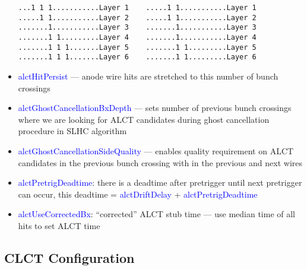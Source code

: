 \begin{itemize}
\begin{verbatim}
...1 1 1...........Layer 1    .....1 1...........Layer 1
.....1 1...........Layer 2    .....1 1...........Layer 2
.......1...........Layer 3    .......1...........Layer 3
.......1 1.........Layer 4    .......1...........Layer 4
.......1 1 1.......Layer 5    .......1 1.........Layer 5
.......1 1 1.......Layer 6    .......1 1.........Layer 6
\end{verbatim}
	\item \textcolor{blue}{alctHitPersist} --- anode wire hits are stretched to this number of bunch crossings
	\item \textcolor{blue}{alctGhostCancellationBxDepth} --- sets number of previous bunch crossings where we are looking for ALCT candidates during ghost cancellation procedure in SLHC algorithm
	\item \textcolor{blue}{alctGhostCancellationSideQuality} --- enables quality requirement on ALCT candidates in the previous bunch crossing with in the previous and next wires
	\item \textcolor{blue}{alctPretrigDeadtime}: there is a deadtime after pretrigger until next pretrigger can occur, this deadtime = \textcolor{blue}{alctDriftDelay} + \textcolor{blue}{alctPretrigDeadtime}
	\item \textcolor{blue}{alctUseCorrectedBx}: ``corrected'' ALCT stub time --- use median time of all hits to set ALCT time
\end{itemize}

\newpage

\subsection{CLCT Configuration}
\label{sec:CLCT_conf}

